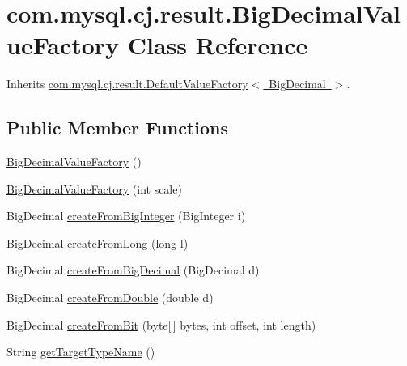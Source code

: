 \hypertarget{classcom_1_1mysql_1_1cj_1_1result_1_1_big_decimal_value_factory}{}\section{com.\+mysql.\+cj.\+result.\+Big\+Decimal\+Value\+Factory Class Reference}
\label{classcom_1_1mysql_1_1cj_1_1result_1_1_big_decimal_value_factory}


Inherits \mbox{\hyperlink{classcom_1_1mysql_1_1cj_1_1result_1_1_default_value_factory}{com.\+mysql.\+cj.\+result.\+Default\+Value\+Factory$<$ Big\+Decimal $>$}}.

\subsection*{Public Member Functions}
\begin{DoxyCompactItemize}
\item 
\mbox{\hyperlink{classcom_1_1mysql_1_1cj_1_1result_1_1_big_decimal_value_factory_a42d70bf714fa45a53c140107bdab787b}{Big\+Decimal\+Value\+Factory}} ()
\item 
\mbox{\hyperlink{classcom_1_1mysql_1_1cj_1_1result_1_1_big_decimal_value_factory_a2ca9b1d72c0356fd25d82132f8c83210}{Big\+Decimal\+Value\+Factory}} (int scale)
\item 
Big\+Decimal \mbox{\hyperlink{classcom_1_1mysql_1_1cj_1_1result_1_1_big_decimal_value_factory_a4ad58a8fd9228cf82aa94326cfdca887}{create\+From\+Big\+Integer}} (Big\+Integer i)
\item 
Big\+Decimal \mbox{\hyperlink{classcom_1_1mysql_1_1cj_1_1result_1_1_big_decimal_value_factory_a2a40c1118f2a5ca90c75772ac764f20b}{create\+From\+Long}} (long l)
\item 
Big\+Decimal \mbox{\hyperlink{classcom_1_1mysql_1_1cj_1_1result_1_1_big_decimal_value_factory_aa414a1622fd81d3ebcbbebd2fb339038}{create\+From\+Big\+Decimal}} (Big\+Decimal d)
\item 
Big\+Decimal \mbox{\hyperlink{classcom_1_1mysql_1_1cj_1_1result_1_1_big_decimal_value_factory_a28ef726d00bb68aa0b42e511210179a2}{create\+From\+Double}} (double d)
\item 
Big\+Decimal \mbox{\hyperlink{classcom_1_1mysql_1_1cj_1_1result_1_1_big_decimal_value_factory_a64bfb50c290e4a90430913941ad66414}{create\+From\+Bit}} (byte\mbox{[}$\,$\mbox{]} bytes, int offset, int length)
\item 
String \mbox{\hyperlink{classcom_1_1mysql_1_1cj_1_1result_1_1_big_decimal_value_factory_a1d7ae8a6ba7ab702d6bc4a30c9f66bd5}{get\+Target\+Type\+Name}} ()
\end{DoxyCompactItemize}



